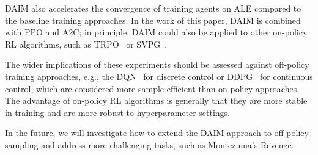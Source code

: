 DAIM also accelerates the convergence of training agents on ALE compared to the baseline training approaches. In the work of this paper, DAIM is combined with PPO and A2C; in principle, DAIM could also be applied to other on-policy RL algorithms, such as TRPO~\cite{schulman2015trust} or SVPG~\cite{liu2017stein}. 

The wider implications of these experiments should be assessed against off-policy training approaches, e.g., the DQN~\cite{mnih2015human} for discrete control or DDPG~\cite{lillicrap2015continuous} for continuous control, which are considered more sample efficient than on-policy approaches. The advantage of on-policy RL algorithms is generally that they are more stable in training and are more robust to hyperparameter settings.

In the future, we will investigate how to extend the DAIM approach to off-policy sampling and address more challenging tasks, such as Montezuma's Revenge.
